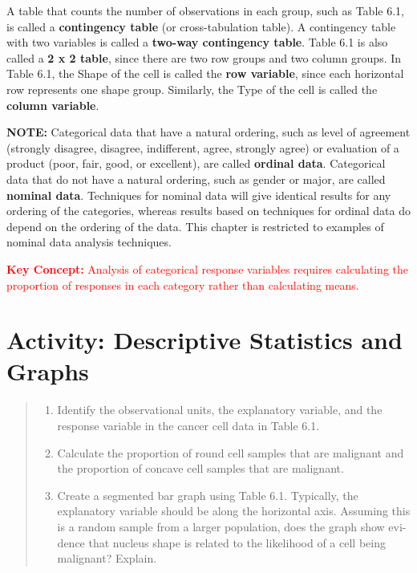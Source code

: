 \documentclass[
]{report}
\providecommand{\tightlist}{%
  \setlength{\itemsep}{0pt}\setlength{\parskip}{0pt}}
\begin{document}
A table that counts the number of observations in each group, such as Table 6.1, is called a \textbf{contingency table} (or cross-tabulation table). A contingency table with two variables is called a \textbf{two-way contingency table}. Table 6.1 is also called a \textbf{2 x 2 table}, since there are two row groups and two column groups. In Table
6.1, the Shape of the cell is called the \textbf{row variable}, since each horizontal row represents one shape group.
Similarly, the Type of the cell is called the \textbf{column variable}.

\large

\textbf{NOTE:}
Categorical data that have a natural ordering, such as level of agreement (strongly disagree, disagree,
indifferent, agree, strongly agree) or evaluation of a product (poor, fair, good, or excellent), are called
\textbf{ordinal data}. Categorical data that do not have a natural ordering, such as gender or major, are called
\textbf{nominal data}. Techniques for nominal data will give identical results for any ordering of the categories,
whereas results based on techniques for ordinal data do depend on the ordering of the data. This chapter
is restricted to examples of nominal data analysis techniques.
\normalsize

\Large

\textbf{\textcolor{red}{Key Concept:}}
\textcolor{red}{Analysis of categorical response variables requires calculating the proportion of responses in each
category rather than calculating means.}
\normalsize

\section*{Activity: Descriptive Statistics and Graphs}\label{activity-descriptive-statistics-and-graphs}

\begin{quote}
\begin{enumerate}
\def\labelenumi{\arabic{enumi}.}
\tightlist
\item
  Identify the observational units, the explanatory variable, and the response variable in the cancer cell
  data in Table 6.1.
\item
  Calculate the proportion of round cell samples that are malignant and the proportion of concave cell
  samples that are malignant.
\item
  Create a segmented bar graph using Table 6.1. Typically, the explanatory variable should be along the
  horizontal axis. Assuming this is a random sample from a larger population, does the graph show evi-
  dence that nucleus shape is related to the likelihood of a cell being malignant? Explain.
\end{enumerate}
\end{quote}
\end{document}
